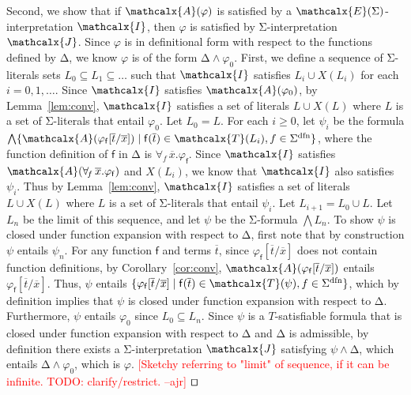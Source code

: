 \documentclass[runningheads,a4paper]{llncs}
\newcommand\DDD{\Delta}
\newcommand{\con}[1]{\mathsf{#1}}
\renewcommand\vec[1]{\overline{#1}}
\let\oldSigma=\Sigma
\def\Sigma{\mathrm{\oldSigma}}
\let\oldDelta=\Delta
\def\Delta{\mathrm{\oldDelta}}
\let\oldwedge=\wedge
\def\wedge{\mathrel{\oldwedge}}
\newcommand{\terms}{\mathcalx{T}}
\newcommand{\I}{\mathcalx{I}}
\newcommand{\J}{\mathcalx{J}}
\newcommand{\conv}{\mathcalx{A}}
\newcommand{\sfundefs}[1]{#1^\mathrm{dfn}}
\newcommand{\forallf}[1]{\forall_{\!#1\:}}
\newcommand{\extendsig}[1]{\mathcalx{E}( #1 )}
\newcommand{\rem}[1]{\textcolor{red}{[#1]}}
\newcommand{\ajr}[1]{\rem{#1 --ajr}}
\newcommand{\absconstraints}{X}
\renewcommand\qed{{\hfill$\squareforqed$}}
\begin{document}
\begin{proofsketch}
Second, we show that if $\conv( \varphi )$ is satisfied by a
$\extendsig{\Sigma}$-interpretation $\I$, then $\varphi$ is satisfied by
$\Sigma$-interpretation $\J$. Since $\varphi$ is in definitional form with
respect to the functions defined by $\DDD$, we know $\varphi$ is of the form
$\DDD \wedge \varphi_0$. 
First, we define a sequence of $\Sigma$-literals sets $L_0 \subseteq L_1 \subseteq \ldots$
such that $\I$ satisfies $L_i \cup \absconstraints( L_i )$ for each $i = 0, 1, \ldots$.
Since $\I$ satisfies $\conv( \varphi_0 )$,
by Lemma~\ref{lem:conv}, 
$\I$ satisfies a set of literals $L \cup \absconstraints( L )$ where $L$ is a set of $\Sigma$-literals that entail $\varphi_0$.
Let $L_0 = L$.
For each $i \geq 0$,
let $\psi_i$ be the formula $\bigwedge \{ \conv( \varphi_{\con{f}}[ \vec t / \vec x ] ) \mid \con{f}( \vec t ) \in \terms( L_i ), f \in \sfundefs{\Sigma} \}$,
where the function definition of $\con{f}$ in $\DDD$ is $\forallf{f} \vec x. \varphi_{\con{f}}$.
Since $\I$ satisfies $\conv( \forallf{f} \vec x. \varphi_{\con{f}} )$ and $\absconstraints( L_i )$,
we know that $\I$ also satisfies $\psi_i$.
Thus by Lemma~\ref{lem:conv},
$\I$ satisfies a set of literals $L \cup \absconstraints( L )$ where $L$ is a set of $\Sigma$-literals that entail $\psi_i$.
Let $L_{i+1} = L_0 \cup L$.
Let $L_n$ be the limit of this sequence,
and let $\psi$ be the $\Sigma$-formula $\bigwedge L_n$.
To show $\psi$ is closed under function expansion with respect to $\DDD$,
first note that by construction $\psi$ entails $\psi_n$.
For any function $\con{f}$ and terms $\vec t$, since $\varphi_{\con{f}}[ \vec t / \vec x ]$ does not contain function definitions,
by Corollary~\ref{cor:conv},
$\conv( \varphi_{\con{f}}[ \vec t / \vec x ] )$ entails $\varphi_{\con{f}}[ \vec t / \vec x ]$.
Thus, $\psi$ entails $\{ \varphi_{\con{f}}[ \vec t / \vec x ] \mid \con{f}( \vec t ) \in \terms( \psi ), f \in \sfundefs{\Sigma} \}$,
which by definition implies that $\psi$ is closed under function expansion with respect to $\DDD$.
Furthermore, $\psi$ entails $\varphi_0$ since $L_0 \subseteq L_n$.
Since $\psi$ is a $T$-satisfiable formula that is closed under function expansion with respect to $\DDD$ and $\DDD$ is admissible, 
by definition there exists a $\Sigma$-interpretation $\J$ satisfying $\psi \wedge \DDD$, which entails $\DDD \wedge \varphi_0$,
which is $\varphi$.
\ajr{Sketchy referring to "limit" of sequence, if it can be infinite. TODO: clarify/restrict.}
\qed
\end{proofsketch}
\end{document}
